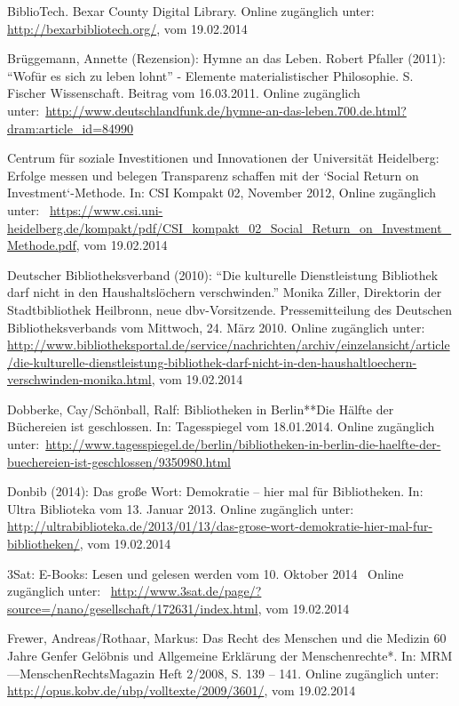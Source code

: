\documentclass[a4paper,
fontsize=11pt,
oneside,
numbers=noperiodatend,
parskip=half-,
bibliography=totoc,
final
]{scrartcl}
\begin{document}
BiblioTech. Bexar County Digital Library. Online zugänglich unter:~
\url{http://bexarbibliotech.org/}, vom 19.02.2014~

Brüggemann, Annette (Rezension): Hymne an das Leben. Robert Pfaller
(2011): \enquote{Wofür es sich zu leben lohnt} - Elemente
materialistischer Philosophie. S. Fischer Wissenschaft. Beitrag vom
16.03.2011. Online zugänglich
unter:~\url{http://www.deutschlandfunk.de/hymne-an-das-leben.700.de.html?dram:article_id=84990}

Centrum für soziale Investitionen und Innovationen der Universität
Heidelberg: Erfolge messen und belegen Transparenz schaffen mit der
`Social Return on Investment`-Methode. In: CSI Kompakt 02, November
2012, Online zugänglich unter:~
\url{https://www.csi.uni-heidelberg.de/kompakt/pdf/CSI_kompakt_02_Social_Return_on_Investment_Methode.pdf},
vom 19.02.2014

Deutscher Bibliotheksverband (2010): \enquote{Die kulturelle
Dienstleistung Bibliothek darf nicht in den Haushaltslöchern
verschwinden.} Monika Ziller, Direktorin der Stadtbibliothek Heilbronn,
neue dbv-Vorsitzende. Pressemitteilung des Deutschen Bibliotheksverbands
vom Mittwoch, 24. März 2010. Online zugänglich unter:\\
\href{http://www.bibliotheksportal.de/service/nachrichten/archiv/einzelansicht/article/die-kulturelle-dienstleistung-bibliothek-darf-nicht-in-den-haushaltloechern-verschwinden-monika.html}{http://www.bibliotheksportal.de/service/nachrichten/archiv/einzelansicht/article/die-kulturelle-dienstleistung-bibliothek-darf-nicht-in-den-haushaltloechern-verschwinden-monika.html},
vom 19.02.2014

Dobberke, Cay/Schönball, Ralf: Bibliotheken in Berlin**Die Hälfte der
Büchereien ist geschlossen. In: Tagesspiegel vom 18.01.2014. Online
zugänglich
unter:~\url{http://www.tagesspiegel.de/berlin/bibliotheken-in-berlin-die-haelfte-der-buechereien-ist-geschlossen/9350980.html}

Donbib (2014): Das große Wort: Demokratie -- hier mal für Bibliotheken.
In: Ultra Biblioteka vom 13. Januar 2013. Online zugänglich unter:~
\url{http://ultrabiblioteka.de/2013/01/13/das-grose-wort-demokratie-hier-mal-fur-bibliotheken/},
vom 19.02.2014

3Sat: E-Books: Lesen und gelesen werden vom 10. Oktober 2014~ Online
zugänglich unter:~
\url{http://www.3sat.de/page/?source=/nano/gesellschaft/172631/index.html},
vom 19.02.2014

Frewer, Andreas/Rothaar, Markus: Das Recht des Menschen und die Medizin
60 Jahre Genfer Gelöbnis und Allgemeine Erklärung der Menschenrechte*.
In: MRM ---MenschenRechtsMagazin Heft 2/2008, S. 139 -- 141. Online
zugänglich unter:~ \url{http://opus.kobv.de/ubp/volltexte/2009/3601/},
vom 19.02.2014
\end{document}
